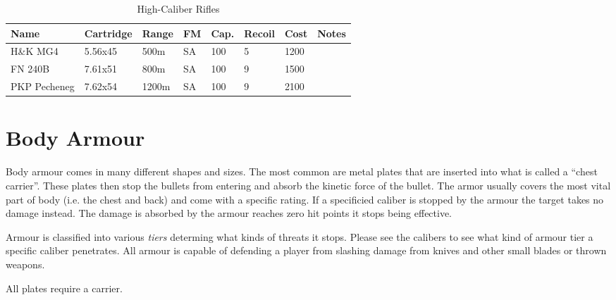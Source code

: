 \begin{table}
  \caption{High-Caliber Rifles}
  \begin{center}
    \begin{tabular}{| l | l | l | l | l | l | l | l |}
      \hline
      \textbf{Name} & \textbf{Cartridge} & \textbf{Range} &
      \textbf{FM} & \textbf{Cap.} & \textbf{Recoil} &
      \textbf{Cost} & \textbf{Notes} \\ \hline


      H\&K MG4     & 5.56x45 &  500m & SA & 100 & 5 & 1200 & \\ \hline
      FN 240B      & 7.61x51 &  800m & SA & 100 & 9 & 1500 & \\ \hline
      PKP Pecheneg & 7.62x54 & 1200m & SA & 100 & 9 & 2100 & \\ \hline

    \end{tabular}
  \end{center}
\end{table}

\section{Body Armour}

Body armour comes in many different shapes and sizes. The most common are metal
plates that are inserted into what is called a ``chest carrier''. These plates
then stop the bullets from entering and absorb the kinetic force of the bullet.
The armor usually covers the most vital part of body (i.e. the chest and back)
and come with a specific rating. If a specificied caliber is stopped by the
armour the target takes no damage instead. The damage is absorbed by the armour
reaches zero hit points it stops being effective.

Armour is classified into various \emph{tiers} determing what kinds of threats
it stops. Please see the calibers to see what kind of armour tier a specific
caliber penetrates. All armour is capable of defending a player from slashing
damage from knives and other small blades or thrown weapons.

All plates require a carrier.

